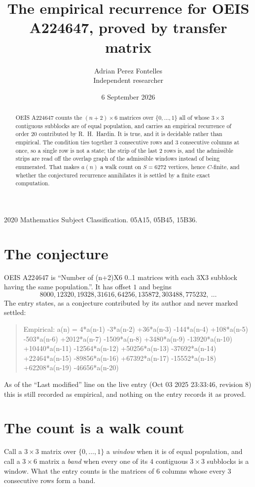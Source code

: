 \documentclass[11pt,a4paper]{article}
\title{The empirical recurrence for OEIS A224647, proved by transfer matrix}
\author{Adrian Perez Fontelles\\ \small Independent researcher}
\date{6 September 2026}
\theoremstyle{plain}
\theoremstyle{definition}
\begin{document}
\maketitle

\begin{abstract}
OEIS A224647 counts the $(n+2)\times6$ matrices over $\{0,\dots,1\}$ all of whose
$3\times3$ contiguous subblocks are of equal population, and carries an empirical recurrence of order
$20$ contributed by R.~H.~Hardin. It is true, and it is decidable rather than empirical.
The condition ties together $3$ consecutive rows and $3$ consecutive columns at once, so a
single row is not a state; the strip of the last $2$ rows is, and the admissible strips
are read off the overlap graph of the admissible windows instead of being enumerated. That
makes $a(n)$ a walk count on $S=6272$ vertices, hence $C$-finite, and whether the conjectured
recurrence annihilates it is settled by a finite exact computation.
\end{abstract}

\noindent\small 2020 Mathematics Subject Classification. 05A15, 05B45, 15B36.\normalsize

\section{The conjecture}

OEIS A224647 is ``Number of (n+2)X6 0..1 matrices with each 3X3 subblock having the same population.''. It has offset $1$ and begins
\[
8000, 12320, 19328, 31616, 64256, 135872, 303488, 775232,\ \dots
\]
The entry states, as a conjecture contributed by its author and never marked settled:
\begin{quote}
Empirical: a(n) = 4*a(n-1) -3*a(n-2) +36*a(n-3) -144*a(n-4) +108*a(n-5) -503*a(n-6) +2012*a(n-7) -1509*a(n-8) +3480*a(n-9) -13920*a(n-10) +10440*a(n-11) -12564*a(n-12) +50256*a(n-13) -37692*a(n-14) +22464*a(n-15) -89856*a(n-16) +67392*a(n-17) -15552*a(n-18) +62208*a(n-19) -46656*a(n-20)
\end{quote}
As of the ``Last modified'' line on the live entry (Oct 03 2025 23:33:46, revision 8) this is still
recorded as empirical, and nothing on the entry records it as proved.

\section{The count is a walk count}

Call a $3\times3$ matrix over $\{0,\dots,1\}$ a \emph{window} when it is of equal population, and
call a $3\times6$ matrix a \emph{band} when every one of its $4$ contiguous
$3\times3$ subblocks is a window. What the entry counts is the matrices of $6$ columns
whose every $3$ consecutive rows form a band.
\end{document}

